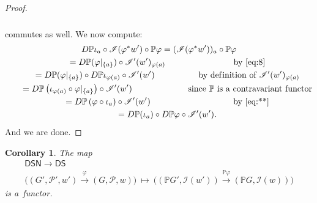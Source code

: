\documentclass[10pt,a4paper]{amsart}
\numberwithin{equation}{section}
\newtheorem{Corollary}[Theorem]{Corollary}
\begin{document}
\begin{proof}
\begin{gather}
\begin{split}
\end{split}
\end{gather}
commutes as well.
We now compute:
\begin{gather*}
D\mathbb{P}\iota_a \circ \mathscr{I} (\varphi^*w')\circ \mathbb{P}\varphi  =   (\mathscr{I} (\varphi^*w'))_a \circ
\mathbb{P}\varphi
\\
\qquad
  =   D \mathbb{P} (\varphi|_{\{a\}})\circ \mathscr{I}' (w')_{\varphi(a)}
\qquad
\hspace{21mm}
\text{by~\eqref{eq:8}}
\\
\qquad
  =   D \mathbb{P} (\varphi|_{\{a\}})\circ D\mathbb{P} \iota_{\varphi(a)} \circ \mathscr{I}' (w')
\hspace{18mm}
\text{by def\/inition of}~\mathscr{I}' (w')_{\varphi(a)}
\\
\qquad
  =   D \mathbb{P} \left(\iota_{\varphi(a)} \circ \varphi|_{\{a\}} \right) \circ \mathscr{I}' (w')
\hspace{23mm}
\text{since $\mathbb{P}$ is a~contravariant functor}
\\
\qquad
  =   D \mathbb{P} \left(\varphi \circ \iota_a \right) \circ \mathscr{I}' (w')
\hspace{34mm}
\text{by~\eqref{eq:**}}
\\
\qquad
  =   D \mathbb{P} (\iota_a) \circ D\mathbb{P} \varphi \circ \mathscr{I}' (w').
\end{gather*}
And we are done.
\end{proof}


\begin{Corollary}
The map
\begin{gather*}
\mathsf{DSN} \to \mathsf{DS}
\\
\big((G',{\mathcal P}', w') \xrightarrow{\varphi} (G,{\mathcal P},w)\big)
\ \mapsto \ \big((\mathbb{P} G', \mathscr{I} (w'))\xrightarrow{\mathbb{P} \varphi} (\mathbb{P} G, \mathscr{I} (w))\big)
\end{gather*}
is a~functor.
\end{Corollary}
\end{document}
